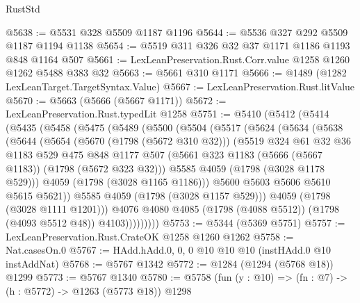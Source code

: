 \begin{lexlean}{RustStd}
\begin{coremodule}
@5638 := @5531 @328 @5509 @1187 @1196
@5644 := @5536 @327 @292 @5509 @1187 @1194 @1138
@5654 := @5519 @311 @326 @32 @37 @1171 @1186 @1193 @848 @1164 @507
@5661 := LexLeanPreservation.Rust.Corr.value @1258 @1260 @1262 @5488 @383 @32
@5663 := @5661 @310 @1171
@5666 := @1489 (@1282 LexLeanTarget.TargetSyntax.Value)
@5667 := LexLeanPreservation.Rust.litValue
@5670 := @5663 (@5666 (@5667 @1171))
@5672 := LexLeanPreservation.Rust.typedLit @1258
@5751 := @5410
    (@5412
      (@5414
        (@5435
          (@5458
            (@5475
              (@5489
                (@5500
                  (@5504
                    (@5517
                      (@5624
                        (@5634
                          (@5638
                            (@5644
                              (@5654
                                (@5670 (@1798 (@5672 @310 @32)))
                                (@5519
                                  @324
                                  @61
                                  @32
                                  @36
                                  @1183
                                  @529
                                  @475
                                  @848
                                  @1177
                                  @507
                                  (@5661 @323 @1183 (@5666 (@5667 @1183)) (@1798 (@5672 @323 @32)))
                                  @5585
                                  @4059
                                  (@1798 (@3028 @1178 @529)))
                                @4059
                                (@1798 (@3028 @1165 @1186)))
                              @5600
                              @5603
                              @5606
                              @5610
                              @5615
                              @5621))
                          @5585
                          @4059
                          (@1798 (@3028 @1157 @529)))
                        @4059
                        (@1798 (@3028 @1111 @1201)))
                      @4076
                      @4080
                      @4085
                      (@1798 (@4088 @5512))
                      (@1798 (@4093 @5512 @48))
                      @4103)))))))))
@5753 := @5344 (@5369 @5751)
@5757 := LexLeanPreservation.Rust.CrateOK @1258 @1260 @1262
@5758 := Nat.casesOn.{0}
@5767 := HAdd.hAdd.{0, 0, 0} @10 @10 @10 (instHAdd.{0} @10 instAddNat)
@5768 := @5767 @1342
@5772 := @1284 (@1294 (@5768 @18)) @1299
@5773 := @5767 @1340
@5780 := @5758 (fun (y : @10) => (fn : @7) -> (h : @5772) -> @1263 (@5773 @18)) @1298

\end{coremodule}
\end{lexlean}
